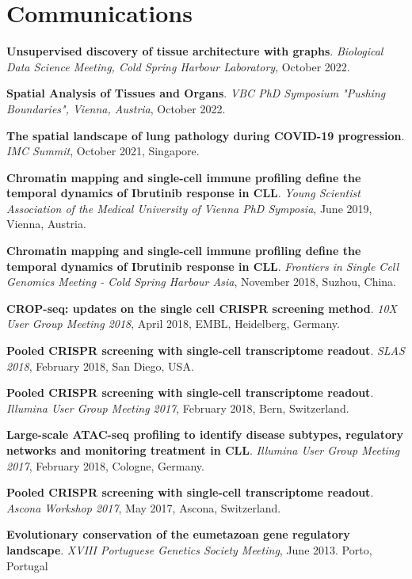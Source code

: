 \documentclass[11pt,a4paper,roman]{moderncv} %
\begin{document}
\section{Communications}
        \begin{etaremune}[leftmargin=1.0cm,itemindent=0pt,topsep=10pt,itemsep=2pt,partopsep=0pt,parsep=0pt]
        \item
        \textbf{Unsupervised discovery of tissue architecture with graphs}. \textit{Biological Data Science Meeting, Cold Spring Harbour Laboratory}, October 2022.
        \item
        \textbf{Spatial Analysis of Tissues and Organs}. \textit{VBC PhD Symposium "Pushing Boundaries", Vienna, Austria}, October 2022.
        \item
        \textbf{The spatial landscape of lung pathology during COVID-19 progression}. \textit{IMC Summit}, October 2021, Singapore.
        \item
        \textbf{Chromatin mapping and single-cell immune profiling define the temporal dynamics of Ibrutinib response in CLL}. \textit{Young Scientist Association of the Medical University of Vienna PhD Symposia}, June 2019, Vienna, Austria.
        \item
        \textbf{Chromatin mapping and single-cell immune profiling define the temporal dynamics of Ibrutinib response in CLL}. \textit{Frontiers in Single Cell Genomics Meeting - Cold Spring Harbour Asia}, November 2018, Suzhou, China.
        \item
        \textbf{CROP-seq: updates on the single cell CRISPR screening method}. \textit{10X User Group Meeting 2018}, April 2018, EMBL, Heidelberg, Germany.
        \item
        \textbf{Pooled CRISPR screening with single-cell transcriptome readout}. \textit{SLAS 2018}, February 2018, San Diego, USA.
        \item
        \textbf{Pooled CRISPR screening with single-cell transcriptome readout}. \textit{Illumina User Group Meeting 2017}, February 2018, Bern, Switzerland.
        \item
        \textbf{Large-scale ATAC-seq profiling to identify disease subtypes, regulatory networks and monitoring treatment in CLL}. \textit{Illumina User Group Meeting 2017}, February 2018, Cologne, Germany.
        \item
        \textbf{Pooled CRISPR screening with single-cell transcriptome readout}. \textit{Ascona Workshop 2017}, May 2017, Ascona, Switzerland.
        \item
        \textbf{Evolutionary conservation of the eumetazoan gene regulatory landscape}. \textit{XVIII Portuguese Genetics Society Meeting}, June 2013. Porto, Portugal
        \end{etaremune}
\end{document}
